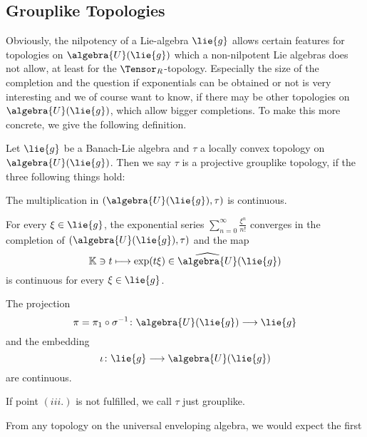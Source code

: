 \documentclass[
11pt,                          %
english                        %
]{article}
\begin{document}
\subsection{Grouplike Topologies}
Obviously, the nilpotency of a Lie-algebra $\lie{g}$ allows certain features for 
topologies on $\algebra{U}(\lie{g})$ which a non-nilpotent Lie algebras does not 
allow, at least for the $\Tensor_R$-topology. 
Especially the size of the completion and the question if exponentials can be 
obtained or not is very interesting and we of course want to know, if there may be 
other topologies on $\algebra{U}(\lie{g})$, which allow bigger completions. To make 
this more concrete, we give the following definition.
\begin{definition}
	\label{def:grouplike-topology}
	Let $\lie{g}$ be a Banach-Lie algebra and $\tau$ a locally convex topology on 
	$\algebra{U}(\lie{g})$. Then we say $\tau$ is a projective grouplike topology, 
	if the three following things hold:
	\begin{definitionlist}
		\item
		The multiplication in $(\algebra{U}(\lie{g}), \tau)$ is continuous.
		
		\item
		For every $\xi \in \lie{g}$, the exponential series $\sum_{n=0}^\infty 
		\frac{\xi^n}{n!}$ converges in the completion of $(\algebra{U}(\lie{g}), 
		\tau)$ and the map
		\begin{equation}
			\label{eq:exp-is-continuous}
			\mathbb{K} \ni t
			\longmapsto
			\exp(t \xi)
			\in \widehat{\algebra{U}}(\lie{g})
		\end{equation}
		is continuous for every $\xi \in \lie{g}$.
		
		\item
		The projection 
		\begin{equation}
			\label{eq:projection}
			\pi 
			= 
			\pi_1 \circ \sigma^{-1}
			\colon
			\algebra{U}(\lie{g})
			\longrightarrow
			\lie{g}
		\end{equation}
		and the embedding
		\begin{equation}
			\label{eq:embedding} 
			\iota \colon \lie{g} \longrightarrow \algebra{U}(\lie{g})
		\end{equation}	
		are continuous.
	\end{definitionlist}
	If point $(iii.)$ is not fulfilled, we call $\tau$ just grouplike.
\end{definition}
From any topology on the universal enveloping algebra, we would expect the first 
\end{document}
